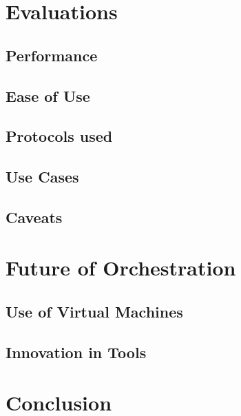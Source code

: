 \documentclass[10pt,twocolumn]{article}
\begin{document}
\section{Evaluations}



\subsection{Performance}



\subsection{Ease of Use}



\subsection{Protocols used}



\subsection{Use Cases}



\subsection{Caveats}




\section{Future of Orchestration}



\subsection{Use of Virtual Machines}



\subsection{Innovation in Tools}



\section{Conclusion}





\end{document}
